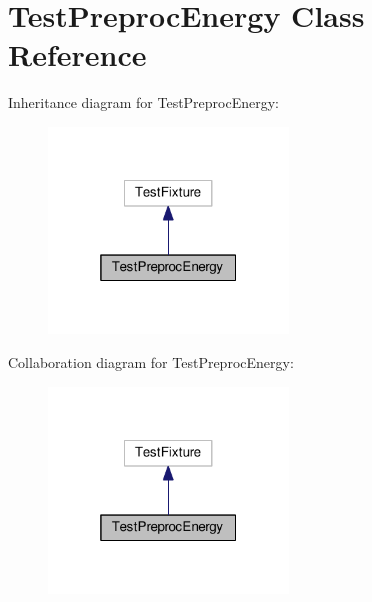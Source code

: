 \hypertarget{class_test_preproc_energy}{}\section{Test\+Preproc\+Energy Class Reference}
\label{class_test_preproc_energy}


Inheritance diagram for Test\+Preproc\+Energy\+:
\nopagebreak
\begin{figure}[H]
\begin{center}
\leavevmode
\includegraphics[width=181pt]{class_test_preproc_energy__inherit__graph}
\end{center}
\end{figure}


Collaboration diagram for Test\+Preproc\+Energy\+:
\nopagebreak
\begin{figure}[H]
\begin{center}
\leavevmode
\includegraphics[width=181pt]{class_test_preproc_energy__coll__graph}
\end{center}
\end{figure}
